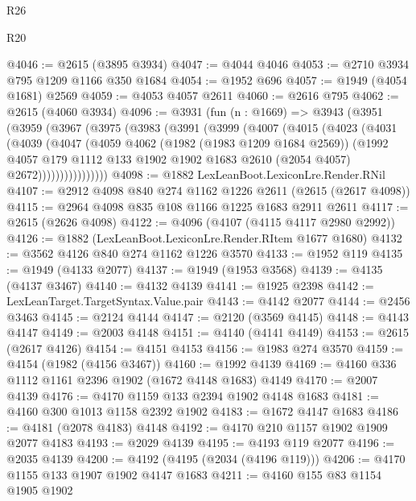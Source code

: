 \begin{lexlean}{R26}
\begin{lexlean}{R20}
\begin{coremodule}
{{{{{{{{{{{{{{{{{{{{{{{{{{{{{{{{{{{{{{{{{{{{{{{{{{{{{{{{{{{{{{{@4046 := @2615 (@3895 @3934)
@4047 := @4044 @4046
@4053 := @2710 @3934 @795 @1209 @1166 @350 @1684
@4054 := @1952 @696
@4057 := @1949 (@4054 @1681) @2569
@4059 := @4053 @4057 @2611
@4060 := @2616 @795
@4062 := @2615 (@4060 @3934)
@4096 := @3931
    (fun (n : @1669) =>
    @3943
      (@3951
        (@3959
          (@3967
            (@3975
              (@3983
                (@3991
                  (@3999
                    (@4007
                      (@4015
                        (@4023
                          (@4031
                            (@4039
                              (@4047
                                (@4059
                                  @4062
                                  (@1982 (@1983 @1209 @1684 @2569))
                                  (@1992
                                    @4057
                                    @179
                                    @1112
                                    @133
                                    @1902
                                    @1902
                                    @1683
                                    @2610
                                    (@2054 @4057)
                                    @2672))))))))))))))))
@4098 := @1882 LexLeanBoot.LexiconLre.Render.RNil
@4107 := @2912 @4098 @840 @274 @1162 @1226 @2611 (@2615 (@2617 @4098))
@4115 := @2964 @4098 @835 @108 @1166 @1225 @1683 @2911 @2611
@4117 := @2615 (@2626 @4098)
@4122 := @4096 (@4107 (@4115 @4117 @2980 @2992))
@4126 := @1882 (LexLeanBoot.LexiconLre.Render.RItem @1677 @1680)
@4132 := @3562 @4126 @840 @274 @1162 @1226 @3570
@4133 := @1952 @119
@4135 := @1949 (@4133 @2077)
@4137 := @1949 (@1953 @3568)
@4139 := @4135 (@4137 @3467)
@4140 := @4132 @4139
@4141 := @1925 @2398
@4142 := LexLeanTarget.TargetSyntax.Value.pair
@4143 := @4142 @2077
@4144 := @2456 @3463
@4145 := @2124 @4144
@4147 := @2120 (@3569 @4145)
@4148 := @4143 @4147
@4149 := @2003 @4148
@4151 := @4140 (@4141 @4149)
@4153 := @2615 (@2617 @4126)
@4154 := @4151 @4153
@4156 := @1983 @274 @3570
@4159 := @4154 (@1982 (@4156 @3467))
@4160 := @1992 @4139
@4169 := @4160 @336 @1112 @1161 @2396 @1902 (@1672 @4148 @1683) @4149
@4170 := @2007 @4139
@4176 := @4170 @1159 @133 @2394 @1902 @4148 @1683
@4181 := @4160 @300 @1013 @1158 @2392 @1902
@4183 := @1672 @4147 @1683
@4186 := @4181 (@2078 @4183) @4148
@4192 := @4170 @210 @1157 @1902 @1909 @2077 @4183
@4193 := @2029 @4139
@4195 := @4193 @119 @2077
@4196 := @2035 @4139
@4200 := @4192 (@4195 (@2034 (@4196 @119)))
@4206 := @4170 @1155 @133 @1907 @1902 @4147 @1683
@4211 := @4160 @155 @83 @1154 @1905 @1902
}}}}}}}}}}}}}}}}}}}}}}}}}}}}}}}}}}}}}}}}}}}}}}}}}}}}}}}}}}}}}}}
\end{coremodule}
\end{lexlean}
\end{lexlean}
